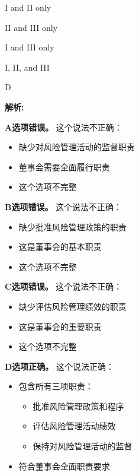 \documentclass{article}
\newenvironment{explanation}
{\textbf{解析:}\par}
{\par}
\begin{document}
\begin{choices}
    \item I and II only
    \item II and III only
    \item I and III only
    \item I, II, and III
\end{choices}

\begin{correctanswer}
    D
\end{correctanswer}

\begin{explanation}
    \textbf{A选项错误。}
    这个说法不正确：
    \begin{itemize}
        \item 缺少对风险管理活动的监督职责
        \item 董事会需要全面履行职责
        \item 这个选项不完整
    \end{itemize}

    \textbf{B选项错误。}
    这个说法不正确：
    \begin{itemize}
        \item 缺少批准风险管理政策的职责
        \item 这是董事会的基本职责
        \item 这个选项不完整
    \end{itemize}

    \textbf{C选项错误。}
    这个说法不正确：
    \begin{itemize}
        \item 缺少评估风险管理绩效的职责
        \item 这是董事会的重要职责
        \item 这个选项不完整
    \end{itemize}

    \textbf{D选项正确。}
    这个说法正确：
    \begin{itemize}
        \item 包含所有三项职责：
        \begin{itemize}
            \item 批准风险管理政策和程序
            \item 评估风险管理活动绩效
            \item 保持对风险管理活动的监督
        \end{itemize}
        \item 符合董事会全面职责要求
    \end{itemize}
\end{explanation}
\end{document}
